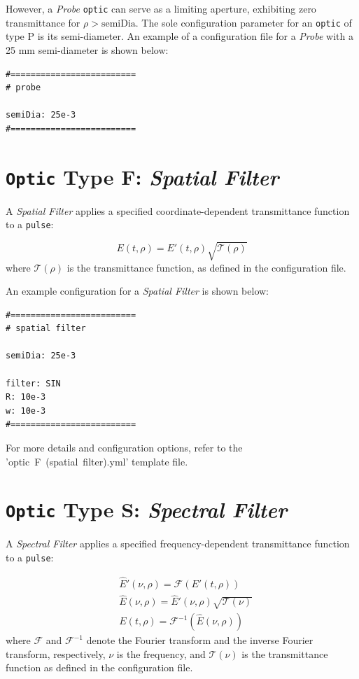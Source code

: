 However, a \textit{Probe} \texttt{optic} can serve as a limiting aperture, exhibiting zero transmittance for \( \rho > \text{semiDia} \). The sole configuration parameter for an \texttt{optic} of type P is its semi-diameter. An example of a configuration file for a \textit{Probe} with a 25 mm semi-diameter is shown below:

\begin{verbatim}
#=========================
# probe

semiDia: 25e-3
#=========================
\end{verbatim}


\section{\texttt{Optic} Type F: \textit{Spatial Filter}}
A \textit{Spatial Filter} applies a specified coordinate-dependent transmittance function to a \texttt{pulse}:

\begin{equation}
E(t,\rho) = E'(t,\rho) \sqrt{\mathcal{T}(\rho)}
\end{equation}
where \( \mathcal{T}(\rho) \) is the transmittance function, as defined in the configuration file.

An example configuration for a \textit{Spatial Filter} is shown below:

\begin{verbatim}
#=========================
# spatial filter

semiDia: 25e-3

filter: SIN
R: 10e-3
w: 10e-3
#=========================
\end{verbatim}

For more details and configuration options, refer to the 'optic~F~(spatial~filter).yml' template file.


\section{\texttt{Optic} Type S: \textit{Spectral Filter}}
A \textit{Spectral Filter} applies a specified frequency-dependent transmittance function to a \texttt{pulse}:

\begin{equation}
 \begin{aligned}
  &\widehat{E}'(\nu,\rho) = \mathcal{F}(E'(t,\rho))\\
  &\widehat{E}(\nu,\rho) = \widehat{E}'(\nu,\rho) \sqrt{\mathcal{T}(\nu)}\\
  &E(t,\rho) = \mathcal{F}^{-1}(\widehat{E}(\nu,\rho))
 \end{aligned}
\end{equation}
where \( \mathcal{F} \) and \( \mathcal{F}^{-1} \) denote the Fourier transform and the inverse Fourier transform, respectively, \( \nu \) is the frequency, and \( \mathcal{T}(\nu) \) is the transmittance function as defined in the configuration file.

